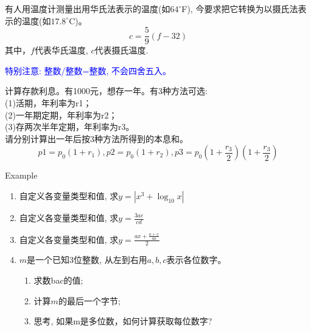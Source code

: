 \begin{frame}[shrink]
\begin{example}[例3.1 p37]
	有人用温度计测量出用华氏法表示的温度(如$64^\circ$F), 
	今要求把它转换为以摄氏法表示的温度(如$17.8^\circ$C)。
	\[ c=\frac{5}{9}(f-32) \]
	其中，$f$代表华氏温度, $c$代表摄氏温度. 
	
	\textcolor{blue}{特别注意: 整数/整数=整数, 不会四舍五入。}
\end{example}
\begin{example}[例3.2 p38]
	计算存款利息。有1000元，想存一年。有3种方法可选:\\
	(1)活期，年利率为r1；\\
	(2)一年期定期，年利率为r2；\\
	(3)存两次半年定期，年利率为r3。\\
	请分别计算出一年后按3种方法所得到的本息和。\\
	\[p1=p_0(1+r_1),p2=p_0(1+r_2),p3=p_0(1+\frac{r_3}{2})(1+\frac{r_3}{2}) \]
\end{example}
\end{frame}

\begin{frame}[shrink]{Example}
\begin{enumerate}\itemsep=10pt
	\item 自定义各变量类型和值, 求$y=|x^3+\log_{10} x|$\\
	\item 自定义各变量类型和值, 求$y=\frac{3ae}{cd}$\\
	\item 自定义各变量类型和值, 求$y=\frac{ax+\frac{a+x}{4a}}{2}$\\
	\item $m$是一个已知3位整数, 从左到右用$a,b,c$表示各位数字。
	\begin{enumerate}[(1)]
		\item 求数bac的值; 
		\item 计算$m$的最后一个字节;
		\item 思考, 如果m是多位数，如何计算获取每位数字?
	\end{enumerate}
\end{enumerate}
\end{frame}


